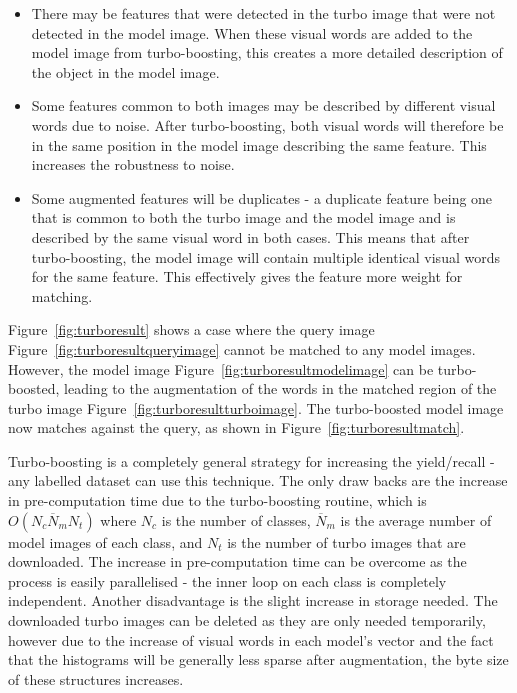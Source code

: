 \documentclass[11pt, onecolumn, a4paper, final]{report} %
\begin{document}
\begin{itemize}
\item There may be features that were detected in the turbo image that were not detected in the model image. When these visual words are added to the model image from turbo-boosting, this creates a more detailed description of the object in the model image.
\item Some features common to both images may be described by different visual words due to noise. After turbo-boosting, both visual words will therefore be in the same position in the model image describing the same feature. This increases the robustness to noise.
\item Some augmented features will be duplicates - a duplicate feature being one that is common to both the turbo image and the model image and is described by the same visual word in both cases. This means that after turbo-boosting, the model image will contain  multiple identical visual words for the same feature. This effectively gives the feature more weight for matching.
\end{itemize}

Figure~\ref{fig:turboresult} shows a case where the query image Figure~\ref{fig:turboresultqueryimage} cannot be matched to any model images. However, the model image Figure~\ref{fig:turboresultmodelimage} can be turbo-boosted, leading to the augmentation of the words in the matched region of the turbo image Figure~\ref{fig:turboresultturboimage}. The turbo-boosted model image now matches against the query, as shown in Figure~\ref{fig:turboresultmatch}.

Turbo-boosting is a completely general strategy for increasing the yield/recall - any labelled dataset can use this technique. The only draw backs are the increase in pre-computation time due to the turbo-boosting routine, which is $O(N_c\overline{N}_mN_t)$ where $N_c$ is the number of classes, $\overline{N}_m$ is the average number of model images of each class, and $N_t$ is the number of turbo images that are downloaded. The increase in pre-computation time can be overcome as the process is easily parallelised - the inner loop on each class is completely independent. Another disadvantage is the slight increase in storage needed. The downloaded turbo images can be deleted as they are only needed temporarily, however due to the increase of visual words in each model's vector and the fact that the histograms will be generally less sparse after augmentation, the byte size of these structures increases.
\end{document}
